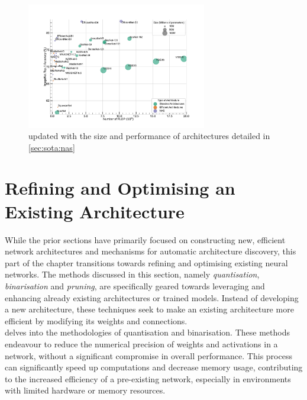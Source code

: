 \begin{figure}[htbp]
    \centering
    \includegraphics[width=0.70\textwidth]{chapter_sota/assets/network_sizes_normal_eff_nas.pdf}
    \caption{ updated with the size and
    performance of architectures detailed in \cref{sec:sota:nas}}
    \label{fig:sota:net_sizes_std_eff_nas}
\end{figure}

\section{Refining and Optimising an Existing Architecture}\label{sec:sota:refining_existing} 

While the prior sections have primarily focused on constructing new, efficient
network architectures and mechanisms for automatic architecture discovery, this
part of the chapter transitions towards refining and optimising existing neural
networks. The methods discussed in this section, namely \emph{quantisation},
\emph{binarisation} and \emph{pruning}, are specifically geared towards
leveraging and enhancing already existing architectures or trained models.
Instead of developing a new architecture, these techniques seek to make an
existing architecture more efficient by modifying its weights and connections.\\

 delves into the methodologies of
quantisation and binarisation. These methods endeavour to reduce the numerical
precision of weights and activations in a network, without a significant
compromise in overall performance. This process can significantly speed up
computations and decrease memory usage, contributing to the increased efficiency
of a pre-existing network, especially in environments with limited hardware or
memory resources.\\

